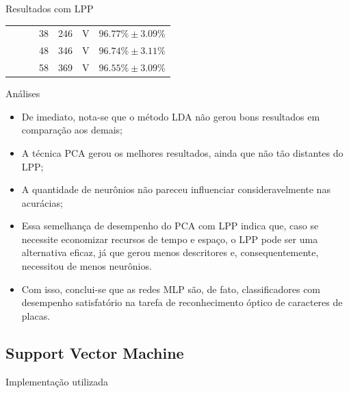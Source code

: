 \begin{frame}{Resultados com LPP}
\begin{tabularx}{\linewidth}{| c | c | c | c | c | c | c |}
                                      &                         &                          & 38 & 246 & V & $ 96.77\% \pm 3.09\%$\\
                                      &                         &                          & 48 & 346 & V & $ 96.74\% \pm 3.11\%$\\
                                      &                         &                          & 58 & 369 & V & $ 96.55\% \pm 3.09\%$\\
                \bottomrule
        \end{tabularx}
\end{frame}

\begin{frame}{Análises}
	\begin{itemize}
		\item De imediato, nota-se que o método LDA não gerou
		bons resultados em comparação aos demais;
		\item A técnica PCA gerou os melhores resultados, ainda que não tão distantes do LPP;
		\item A quantidade de neurônios não pareceu influenciar consideravelmente nas
		acurácias;
		\item Essa semelhança de desempenho do PCA com LPP
indica que, caso se necessite economizar recursos de tempo e espaço, o LPP pode ser
uma alternativa eficaz, já que gerou menos descritores e, consequentemente, necessitou de
menos neurônios.
		\item Com isso, conclui-se que as redes MLP são, de fato, classificadores com desempenho 
satisfatório na tarefa de reconhecimento óptico de caracteres de placas.
	\end{itemize}
\end{frame}

\subsection[SVM]{Support Vector Machine}

\begin{frame}{Implementação utilizada}

\end{frame}
